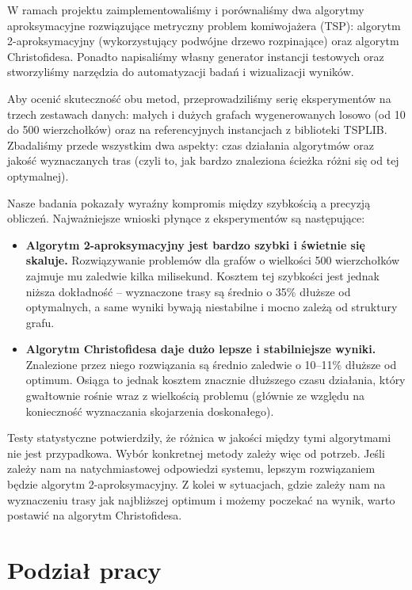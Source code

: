 \documentclass{article}
\theoremstyle{definition}
\theoremstyle{plain}
\theoremstyle{remark}
\begin{document}
W ramach projektu zaimplementowaliśmy i porównaliśmy dwa algorytmy aproksymacyjne rozwiązujące metryczny problem komiwojażera (TSP): algorytm 2-aproksymacyjny (wykorzystujący podwójne drzewo rozpinające) oraz algorytm Christofidesa. Ponadto napisaliśmy własny generator instancji testowych oraz stworzyliśmy narzędzia do automatyzacji badań i wizualizacji wyników.

Aby ocenić skuteczność obu metod, przeprowadziliśmy serię eksperymentów na trzech zestawach danych: małych i dużych grafach wygenerowanych losowo (od 10 do 500 wierzchołków) oraz na referencyjnych instancjach z biblioteki TSPLIB. Zbadaliśmy przede wszystkim dwa aspekty: czas działania algorytmów oraz jakość wyznaczanych tras (czyli to, jak bardzo znaleziona ścieżka różni się od tej optymalnej).

Nasze badania pokazały wyraźny kompromis między szybkością a precyzją obliczeń. Najważniejsze wnioski płynące z eksperymentów są następujące:
\begin{itemize}
    \item \textbf{Algorytm 2-aproksymacyjny jest bardzo szybki i świetnie się skaluje.} Rozwiązywanie problemów dla grafów o wielkości 500 wierzchołków zajmuje mu zaledwie kilka milisekund. Kosztem tej szybkości jest jednak niższa dokładność -- wyznaczone trasy są średnio o 35\% dłuższe od optymalnych, a same wyniki bywają niestabilne i mocno zależą od struktury grafu.
    \item \textbf{Algorytm Christofidesa daje dużo lepsze i stabilniejsze wyniki.} Znalezione przez niego rozwiązania są średnio zaledwie o 10--11\% dłuższe od optimum. Osiąga to jednak kosztem znacznie dłuższego czasu działania, który gwałtownie rośnie wraz z wielkością problemu (głównie ze względu na konieczność wyznaczania skojarzenia doskonałego).
\end{itemize}

\noindent
Testy statystyczne potwierdziły, że różnica w jakości między tymi algorytmami nie jest przypadkowa. Wybór konkretnej metody zależy więc od potrzeb. Jeśli zależy nam na natychmiastowej odpowiedzi systemu, lepszym rozwiązaniem będzie algorytm 2-aproksymacyjny. Z kolei w sytuacjach, gdzie zależy nam na wyznaczeniu trasy jak najbliższej optimum i możemy poczekać na wynik, warto postawić na algorytm Christofidesa.

\newpage
\section{Podział pracy}
\end{document}
